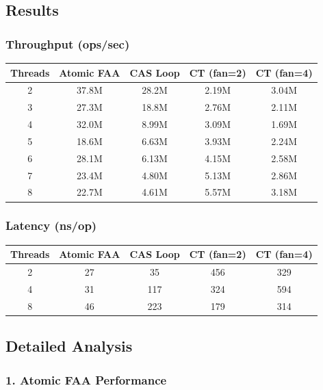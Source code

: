\documentclass[11pt,a4paper]{article}
\begin{document}
\subsection{Results}

\subsubsection*{Throughput (ops/sec)}

\begin{center}
\begin{tabular}{|c|c|c|c|c|}
\hline
\textbf{Threads} & \textbf{Atomic FAA} & \textbf{CAS Loop} & \textbf{CT (fan=2)} & \textbf{CT (fan=4)} \\
\hline
2 & 37.8M & 28.2M & 2.19M & 3.04M \\
3 & 27.3M & 18.8M & 2.76M & 2.11M \\
4 & 32.0M & 8.99M & 3.09M & 1.69M \\
5 & 18.6M & 6.63M & 3.93M & 2.24M \\
6 & 28.1M & 6.13M & 4.15M & 2.58M \\
7 & 23.4M & 4.80M & 5.13M & 2.86M \\
8 & 22.7M & 4.61M & 5.57M & 3.18M \\
\hline
\end{tabular}
\end{center}

\subsubsection*{Latency (ns/op)}

\begin{center}
\begin{tabular}{|c|c|c|c|c|}
\hline
\textbf{Threads} & \textbf{Atomic FAA} & \textbf{CAS Loop} & \textbf{CT (fan=2)} & \textbf{CT (fan=4)} \\
\hline
2 & 27 & 35 & 456 & 329 \\
4 & 31 & 117 & 324 & 594 \\
8 & 46 & 223 & 179 & 314 \\
\hline
\end{tabular}
\end{center}

\subsection{Detailed Analysis}

\subsubsection*{1. Atomic FAA Performance}
\end{document}
